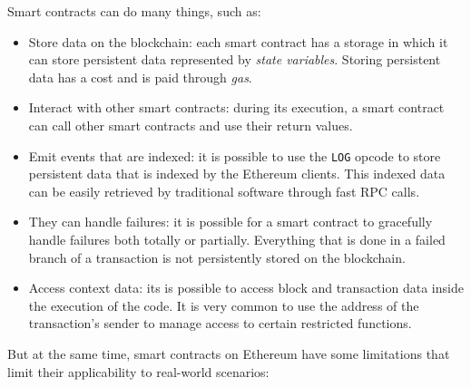 Smart contracts can do many things, such as:

\begin{itemize}
    \item Store data on the blockchain: each smart contract has a storage in which it can store persistent data represented by \textit{state variables}. Storing persistent data has a cost and is paid through \textit{gas}.
    \item Interact with other smart contracts: during its execution, a smart contract can call other smart contracts and use their return values.
    \item Emit events that are indexed: it is possible to use the \lstinline{LOG} opcode to store persistent data that is indexed by the Ethereum clients. This indexed data can be easily retrieved by traditional software through fast RPC calls. 
    \item They can handle failures: it is possible for a smart contract to gracefully handle failures both totally or partially. Everything that is done in a failed branch of a transaction is not persistently stored on the blockchain.
    \item Access context data: its is possible to access block and transaction data inside the execution of the code. It is very common to use the address of the transaction's sender to manage access to certain restricted functions.
\end{itemize}

But at the same time, smart contracts on Ethereum have some limitations that limit their applicability to real-world scenarios:

